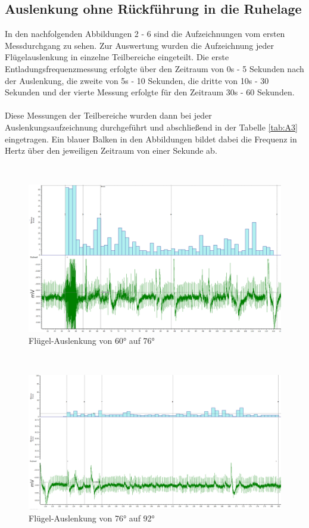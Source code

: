 \documentclass[a4paper]{article}
\begin{document}
\newpage
\subsection{Auslenkung ohne Rückführung in die Ruhelage}

In den nachfolgenden Abbildungen 2 - 6 sind die Aufzeichnungen vom ersten Messdurchgang zu sehen. Zur Auswertung wurden die Aufzeichnung jeder Flügelauslenkung in einzelne Teilbereiche eingeteilt. Die erste Entladungsfrequenzmessung erfolgte über den Zeitraum von 0s - 5 Sekunden nach der Auslenkung, die zweite von 5s - 10 Sekunden, die dritte von 10s - 30 Sekunden und der vierte Messung erfolgte für den Zeitraum 30s - 60 Sekunden. \\ \\
Diese Messungen der Teilbereiche wurden dann bei jeder Auslenkungsaufzeichnung durchgeführt und abschließend in der Tabelle \ref{tab:A3} eingetragen. Ein blauer Balken in den Abbildungen bildet dabei die Frequenz in Hertz über den jeweiligen Zeitraum von einer Sekunde ab. 

\vspace{4.5\baselineskip} \\
\begin{figure}[H]
    \centering
    \includegraphics[scale=0.27]{images/A3_60-76Grad.PNG}
    \caption{\label{fig:A3_1}Flügel-Auslenkung von \ang{60} auf \ang{76}}
\end{figure}

\vspace{2.5\baselineskip} \\
\begin{figure}[H]
    \centering
    \includegraphics[scale=0.25]{images/A3_76-92Grad.PNG}
    \caption{\label{fig:A3_2}Flügel-Auslenkung von \ang{76} auf \ang{92}}
\end{figure}
\end{document}
